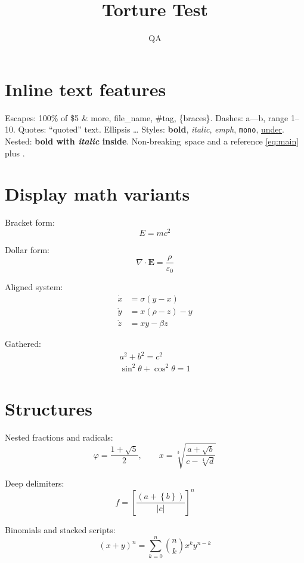 \documentclass{article}
\title{Torture Test}
\author{QA}
\begin{document}
\maketitle

\section{Inline text features}
Escapes: 100\% of \$5 \& more, file\_name, \#tag, \{braces\}.
Dashes: a---b, range 1--10. Quotes: ``quoted'' text. Ellipsis \ldots
Styles: \textbf{bold}, \textit{italic}, \emph{emph}, \texttt{mono}, \underline{under}.
Nested: \textbf{bold with \textit{italic} inside}.
Non-breaking~space and a reference \ref{eq:main} plus \cite{knuth}.

\section{Display math variants}
Bracket form:
\[
  E = mc^{2}
\]

Dollar form:
$$
\nabla \cdot \mathbf{E} = \frac{\rho}{\varepsilon_{0}}
$$

Aligned system:
\begin{align*}
  \dot{x} &= \sigma (y - x) \\
  \dot{y} &= x (\rho - z) - y \\
  \dot{z} &= x y - \beta z
\end{align*}

Gathered:
\begin{gather*}
  a^{2} + b^{2} = c^{2} \\
  \sin^{2}{\theta} + \cos^{2}{\theta} = 1
\end{gather*}

\section{Structures}
Nested fractions and radicals:
\begin{equation}
  \varphi = \frac{1 + \sqrt{5}}{2}, \qquad
  x = \sqrt[3]{\frac{a + \sqrt{b}}{c - \sqrt[4]{d}}}
\end{equation}

Deep delimiters:
\begin{equation}
  f = \left[ \frac{\left( a + \left\{ b \right\} \right)}{\left| c \right|} \right]^{n}
\end{equation}

Binomials and stacked scripts:
\begin{equation}
  (x + y)^{n} = \sum_{k=0}^{n}{\binom{n}{k} x^{k} y^{n-k}}
\end{equation}
\end{document}
